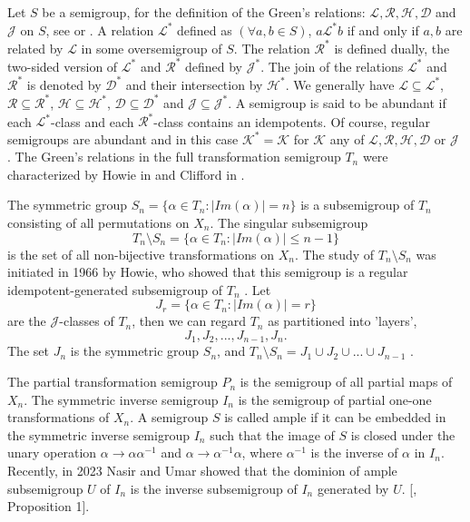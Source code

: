 \documentclass[10pt]{extarticle}
\renewcommand{\mathcal}{\mathscr}
\numberwithin{equation}{section}
\numberwithin{bbb}{section}
\numberwithin{equation}{section}
\begin{document}
Let $S$ be a semigroup, for the definition of the Green's relations: $\mathcal{L},\mathcal{R}, \mathcal{H}, \mathcal{D}$ and $\mathcal{J}$ on $S$, see \cite{14} or \cite{76}. A relation $\mathcal{L^*}$ defined as $(\forall a,b \in S)$, $a\mathcal{L^*}b$ if and only if $a,b$ are related by $\mathcal{L}$ in some oversemigroup of $S$. The relation $\mathcal{R^*}$ is defined dually, the two-sided version of $\mathcal{L^*}$ and $\mathcal{R^*}$ defined by $\mathcal{J^*}$. The join of the relations $\mathcal{L^*}$ and $\mathcal{R^*}$ is denoted by $\mathcal{D^*}$ and their intersection by $\mathcal{H^*}$. We generally have $\mathcal{L}\subseteq \mathcal{L^*}$, $\mathcal{R}\subseteq \mathcal{R^*}$, $\mathcal{H}\subseteq \mathcal{H^*}$, $\mathcal{D}\subseteq \mathcal{D^*}$ and $\mathcal{J}\subseteq \mathcal{J^*}$. A semigroup is said to be abundant if each $\mathcal{L^*}$-class and each $\mathcal{R^*}$-class contains an idempotents. Of course, regular semigroups are abundant and in this case $\mathcal{K^*}=\mathcal{K}$ for $\mathcal{K}$ any of $\mathcal{L}, \mathcal{R}, \mathcal{H}, \mathcal{D}$ or $\mathcal{J}$ \cite{40}. The Green's relations in the full transformation semigroup $T_n$ were characterized by Howie in \cite{6} and Clifford in \cite{1}.

The symmetric group 
$S_n=\{\alpha \in T_n : |Im(\alpha)|=n\}$ is a subsemigroup of $T_n$ consisting of all permutations on $X_n$. The singular subsemigroup $$T_n\setminus S_n=\{\alpha \in T_n: |Im(\alpha)|\leq n-1\}$$ is the set of all non-bijective transformations on $X_n$. The study of $T_n\setminus S_n$ was initiated in 1966 by Howie, who showed that this semigroup is a regular idempotent-generated subsemigroup of $T_n$ \cite{2}.
Let $$J_r=\{\alpha \in T_n : |Im(\alpha)|=r\}$$ are the $\mathcal{J}$-classes of $T_n$, then we can regard $T_n$ as partitioned into 'layers', $$J_1,J_2,...,J_{n-1},J_n.$$ The set $J_n$ is the symmetric group $S_n$, and $T_n\setminus S_n=J_1\cup J_2\cup...\cup J_{n-1}$ \cite{6}.

The partial transformation semigroup $P_n$ is the semigroup of all partial maps of $X_n$. The symmetric inverse semigroup $I_n$ is the semigroup of partial one-one transformations of $X_n$. A semigroup $S$ is called ample if it can be embedded in the symmetric inverse semigroup $I_n$ such that the image of $S$ is closed under the unary operation $\alpha \rightarrow \alpha \alpha^{-1}$ and $\alpha \rightarrow \alpha^{-1}\alpha $, where $\alpha^{-1}$ is the inverse of $\alpha$ in $I_n$. Recently, in 2023 Nasir and Umar showed that the dominion of ample subsemigroup $U$ of $I_n$ is the inverse subsemigroup of $I_n$ generated by $U$. [\cite{7}, Proposition 1].
\end{document}
